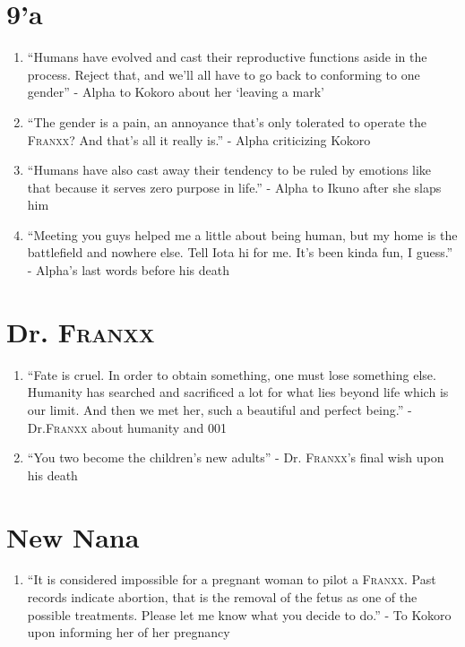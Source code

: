 \documentclass{book}
\numberwithin{equation}{section}
\begin{document}
\section{9'a}
\begin{enumerate}
    \item ``Humans have evolved and cast their reproductive functions aside in the process. Reject that, and we'll all have to go back to conforming to one gender'' - Alpha to Kokoro about her `leaving a mark'
    \item ``The gender is a pain, an annoyance that's only tolerated to operate the \textsc{Franxx}? And that's all it really is.'' - Alpha criticizing Kokoro
    \item ``Humans have also cast away their tendency to be ruled by emotions like that because it serves zero purpose in life.'' - Alpha to Ikuno after she slaps him
    \item ``Meeting you guys helped me a little about being human, but my home is the battlefield and nowhere else. Tell Iota hi for me. It's been kinda fun, I guess.'' - Alpha's last words before his death
\end{enumerate}

\section{Dr. \textsc{Franxx}}
\begin{enumerate}
    \item ``Fate is cruel. In order to obtain something, one must lose something else. Humanity has searched and sacrificed a lot for what lies beyond life which is our limit. And then we met her, such a beautiful and perfect being.'' - Dr.\textsc{Franxx} about humanity and 001
    \item ``You two become the children's new adults'' - Dr. \textsc{Franxx}'s final wish upon his death
\end{enumerate}

\section{New Nana}
\begin{enumerate}
    \item ``It is considered impossible for a pregnant woman to pilot a \textsc{Franxx}. Past records indicate abortion, that is the removal of the fetus as one of the possible treatments. Please let me know what you decide to do.'' - To Kokoro upon informing her of her pregnancy
\end{enumerate}
\end{document}
